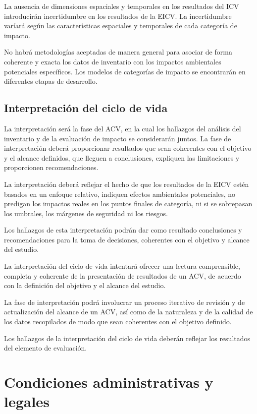 La ausencia de dimensiones espaciales y temporales en los resultados del ICV introducirán incertidumbre en los resultados de la EICV. La incertidumbre varíará según las características espaciales y temporales de cada categoría de impacto.

No habrá metodologías aceptadas de manera general para asociar de forma coherente y exacta los datos de inventario con los impactos ambientales potenciales específicos. Los modelos de categorías de impacto se encontrarán en diferentes etapas de desarrollo.

\section{Interpretación del ciclo de vida}

La interpretación será la fase del ACV, en la cual los hallazgos del análisis del inventario y de la evaluación de impacto se considerarán juntos. La fase de interpretación deberá proporcionar resultados que sean coherentes con el objetivo y el alcance definidos, que lleguen a conclusiones, expliquen las limitaciones y proporcionen recomendaciones.

La interpretación deberá reflejar el hecho de que los resultados de la EICV estén basados en un enfoque relativo, indiquen efectos ambientales potenciales, no predigan los impactos reales en los puntos finales de categoría, ni si se sobrepasan los umbrales, los márgenes de seguridad ni los riesgos.

Los hallazgos de esta interpretación podrán dar como resultado conclusiones y recomendaciones para la toma de decisiones, coherentes con el objetivo y alcance del estudio.

La interpretación del ciclo de vida intentará ofrecer una lectura comprensible, completa y coherente de la presentación de resultados de un ACV, de acuerdo con la definición del objetivo y el alcance del estudio.

La fase de interpretación podrá involucrar un proceso iterativo de revisión y de actualización del alcance de un ACV, así como de la naturaleza y de la calidad de los datos recopilados de modo que sean coherentes con el objetivo definido.

Los hallazgos de la interpretación del ciclo de vida deberán reflejar los resultados del elemento de evaluación.

\chapter{Condiciones administrativas y legales}

